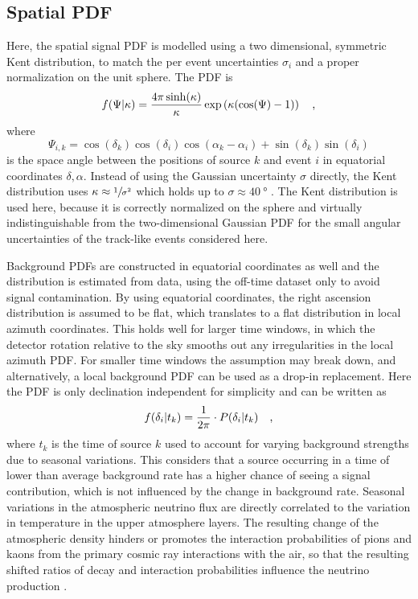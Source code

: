\subsection*{Spatial PDF}
Here, the spatial signal PDF is modelled using a two dimensional, symmetric Kent distribution, to match the per event uncertainties $\sigma_i$ and a proper normalization on the unit sphere.
The PDF is
\begin{equation}
  f(\Psi|\kappa)
  = \frac{4\pi \sinh(\kappa)}{\kappa}\exp\left(\kappa(\cos(\Psi)-1)\right)
  \quad\text{,}
\end{equation}
where
\begin{equation}
  \Psi_{i,k}
  = \cos(\delta_k)\cos(\delta_i)\cos(\alpha_k - \alpha_i) +
    \sin(\delta_k)\sin(\delta_i)
\end{equation}
is the space angle between the positions of source $k$ and event $i$ in equatorial coordinates $\delta, \alpha$.
Instead of using the Gaussian uncertainty $\sigma$ directly, the Kent distribution uses $\kappa \approx \sfrac{1}{\sigma^2}$ which holds up to $\sigma \approx \SI{40}{\degree}$ \cite{Yasutomi:2014kent,Jakob:2012kent}.
The Kent distribution is used here, because it is correctly normalized on the sphere and virtually indistinguishable from the two-dimensional Gaussian PDF for the small angular uncertainties of the track-like events considered here.

Background PDFs are constructed in equatorial coordinates as well and the distribution is estimated from data, using the off-time dataset only to avoid signal contamination.
By using equatorial coordinates, the right ascension distribution is assumed to be flat, which translates to a flat distribution in local azimuth coordinates.
This holds well for larger time windows, in which the detector rotation relative to the sky smooths out any irregularities in the local azimuth PDF.
For smaller time windows the assumption may break down, and alternatively, a local background PDF can be used as a drop-in replacement.
Here the PDF is only declination independent for simplicity and can be written as
\begin{equation}
  f(\delta_i|t_k) = \frac{1}{2\pi}\cdot P(\delta_i|t_k)
  \quad\text{,}
\end{equation}
where $t_k$ is the time of source $k$ used to account for varying background strengths due to seasonal variations.
This considers that a source occurring in a time of lower than average background rate has a higher chance of seeing a signal contribution, which is not influenced by the change in background rate.
Seasonal variations in the atmospheric neutrino flux are directly correlated to the variation in temperature in the upper atmosphere layers.
The resulting change of the atmospheric density hinders or promotes the interaction probabilities of pions and kaons from the primary cosmic ray interactions with the air, so that the resulting shifted ratios of decay and interaction probabilities influence the neutrino production \cite{Barret:1952seasons,Gaisser:2010seasons,Gaisser:2013icrc,GRASHORN2010140}.

